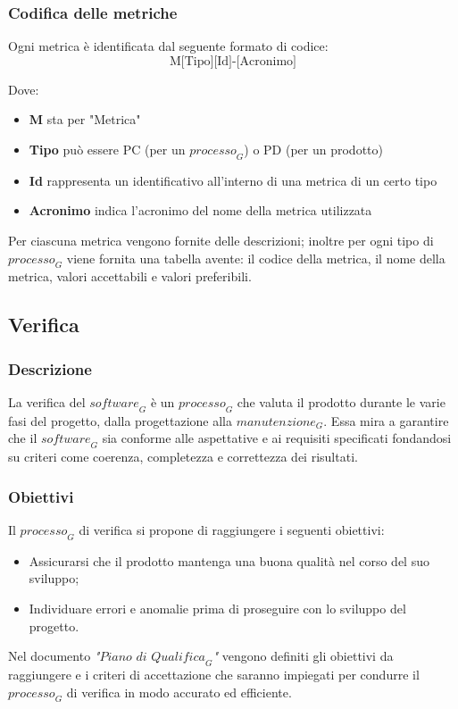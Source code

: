 \subsubsection{Codifica delle metriche}
Ogni metrica è identificata dal seguente formato di codice:
\[
\text{M[Tipo][Id]-[Acronimo]}
\]

Dove:
\begin{itemize}
    \item \textbf{M} sta per "Metrica"
    \item \textbf{Tipo} può essere PC (per un $\textit{processo}_G$) o PD (per un prodotto)
    \item \textbf{Id} rappresenta un identificativo all'interno di una metrica di un certo tipo
    \item \textbf{Acronimo} indica l'acronimo del nome della metrica utilizzata
\end{itemize}
Per ciascuna metrica vengono fornite delle descrizioni; inoltre per ogni tipo di $\textit{processo}_G$ viene fornita una tabella avente: il codice della metrica, il nome della metrica, valori accettabili e valori preferibili.

\subsection{Verifica}
\subsubsection{Descrizione}
La verifica del $\textit{software}_G$ è un $\textit{processo}_G$ che valuta il prodotto durante le varie fasi del progetto, dalla progettazione alla $\textit{manutenzione}_G$. Essa mira a garantire che il $\textit{software}_G$ sia conforme alle aspettative e ai requisiti specificati fondandosi su criteri come coerenza, completezza e correttezza dei risultati.
\subsubsection{Obiettivi}
Il $\textit{processo}_G$ di verifica si propone di raggiungere i seguenti obiettivi:
\begin{itemize}
    \item Assicurarsi che il prodotto mantenga una buona qualità nel corso del suo sviluppo;
    \item Individuare errori e anomalie prima di proseguire con lo sviluppo del progetto.
\end{itemize}
Nel documento \emph{"$\textit{Piano di Qualifica}_G$"} vengono definiti gli obiettivi da raggiungere e i criteri di accettazione  che saranno impiegati per condurre il $\textit{processo}_G$ di verifica in modo accurato ed efficiente. 
